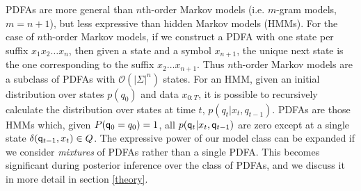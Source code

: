 PDFAs are more general than $n$th-order Markov models (i.e. $m$-gram models, $m=n+1$), but less expressive than hidden Markov models (HMMs).  For the case of $n$th-order Markov models, if we construct a PDFA with one state per suffix $x_1 x_2 \ldots x_n$, then given a state and a symbol $x_{n+1}$, the unique next state is the one corresponding to the suffix $x_2 \ldots x_{n+1}$.  Thus $n$th-order Markov models are a subclass of PDFAs with $\mathcal{O}(|\Sigma|^n)$ states.  For an HMM, given an initial distribution over states $p(q_0)$ and data $x_{0:T}$, it is possible to recursively calculate the distribution over states at time $t$, $p(q_t|x_t,q_{t-1})$.  PDFAs are those HMMs which, given $P(\q_0 = q_0) = 1$, all $p(\q_t|x_t,\q_{t-1})$ are zero except at a single state $\delta(\q_{t-1},x_t) \in Q$.  The expressive power of our model class can be expanded if we consider {\em mixtures} of PDFAs rather than a single PDFA.  This becomes significant during posterior inference over the class of PDFAs, and we discuss it in more detail in section \ref{theory}. \fix[confusing]